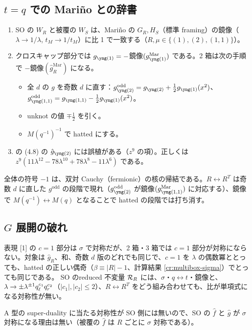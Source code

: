 \subsection{$t = q$ での Mariño との辞書}
\begin{compresult}\label{cr:marino}
\begin{enumerate}
\item SO の $W_R$ と被覆の $W_S$ は、Mariño の $G_R, H_S$（標準 framing）の鏡像（$\lambda \to 1/\lambda$, $t_M \to 1/t_M$）に比 1 で一致する（$R, \mu \in \{(1), (2), (1,1)\}$）。
\item クロスキャップ部分では $g_{\yone} = -$鏡像$(g^{\mathrm{Mar}}_{\yone})$ である。2 箱は次の手順で $-$鏡像$(\hat g^{\mathrm{Mar}}_R)$ になる。
  \begin{itemize}
  \item 全 $d$ の $g$ を奇数 $d$ に直す：$g^{\mathrm{odd}}_{\ytwo} = g_{\ytwo} + \tfrac12 g_{\yone}(x^2)$、$g^{\mathrm{odd}}_{\yoneone} = g_{\yoneone} - \tfrac12 g_{\yone}(x^2)$。
  \item unknot の値 $\mp\tfrac12$ を引く。
  \item $M(q^{-1})^{-1}$ で hatted にする。
  \end{itemize}
\item \cite{Marino09} の (4.8) の $\hat g_{\ytwo}$ には誤植がある（$z^9$ の項）。正しくは $z^9(11\lambda^{12} - 78\lambda^{10} + 78\lambda^8 - 11\lambda^6)$ である。
\end{enumerate}
\end{compresult}
全体の符号 $-1$ は、双対 Cauchy（fermionic）の核の帰結である。$R \leftrightarrow R^T$ は奇数 $d$ に直した $g^{\mathrm{odd}}$ の段階で現れ（$g^{\mathrm{odd}}_{\ytwo}$ が鏡像$(g^{\mathrm{Mar}}_{\yoneone})$ に対応する）、鏡像で $M(q^{-1}) \leftrightarrow M(q)$ となることで hatted の段階では打ち消す。

\subsection{$G$ 展開の破れ}
\begin{compresult}
表現 [1] の $c = 1$ 部分は $\sigma$ で対称だが、2 箱・3 箱では $c = 1$ 部分が対称にならない。対象は $\hat g_R$、和、奇数 $d$ 版のどれでも同じで、$c = 1$ を $\lambda$ の偶数冪ととっても、hatted の正しい偶奇（$\beta \equiv |R| - 1$、計算結果 \ref{cr:multibox-sigma}）でとっても同じである。
SO のreduced 不変量 $\mathcal{R}_R$ には、$\sigma$・$q\leftrightarrow t$・鏡像と、$\lambda \to \pm\lambda^{\pm1}q_\ell^{c_1}q_r^{c_2}$（$|c_1|, |c_2| \le 2$）、$R \leftrightarrow R^T$ をどう組み合わせても、比が単項式になる対称性が無い。
\end{compresult}
A 型の super-duality に当たる対称性が SO 側には無いので、SO の $\hat f$ と $\hat g$ が $\sigma$ 対称になる理由は無い（被覆の $\hat f$ は $R$ ごとに $\sigma$ 対称である）。

